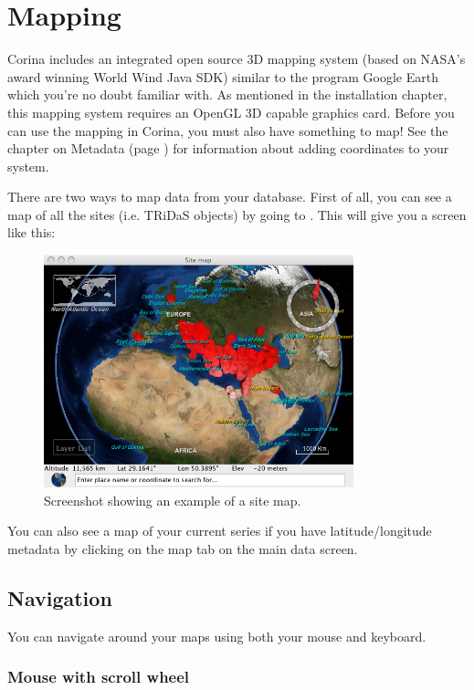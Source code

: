 \chapter{Mapping}
Corina includes an integrated open source 3D mapping system (based on NASA's award winning World Wind Java SDK) similar to the program Google Earth which you're no doubt familiar with. As mentioned in the installation chapter, this mapping system requires an OpenGL 3D capable graphics card. Before you can use the mapping in Corina, you must also have something to map! See the chapter on Metadata (page \pageref{txt:metadata}) for information about adding coordinates to your system.

There are two ways to map data from your database. First of all, you can see a map of all the sites (i.e. TRiDaS objects) by going to . This will give you a screen like this:

\begin{figure}[hbtp]
  \label{fig:map}
  \centering
  \includegraphics[width=0.8\textwidth]{Images/sitemap.png}
  \caption{Screenshot showing an example of a site map.}
\end{figure}


You can also see a map of your current series if you have latitude/longitude metadata by clicking on the map tab on the main data screen. 

\section{Navigation}
You can navigate around your maps using both your mouse and keyboard.

\subsection{Mouse with scroll wheel}


